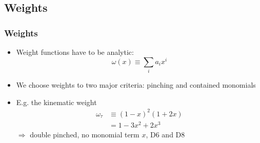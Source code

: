\documentclass{beamer}
\begin{document}
\subsection{Weights}
\begin{frame}
  \frametitle{Weights}
  \begin{itemize}
    \item Weight functions have to be analytic:
      \begin{equation}
        \omega(x) \equiv \sum_i a_i x^i
      \end{equation}
    \item We choose weights to two major criteria: pinching and contained monomials
    \item E.g. the kinematic weight
          \begin{equation}
            \begin{split}
              \omega_\tau &\equiv (1 - x)^2(1 + 2x) \\
              &= 1 - 3x^2 + 2x^3
            \end{split}
          \end{equation}
          \(\Rightarrow\) double pinched, no monomial term \(x\), D6 and D8
  \end{itemize}
\end{frame}
\end{document}
